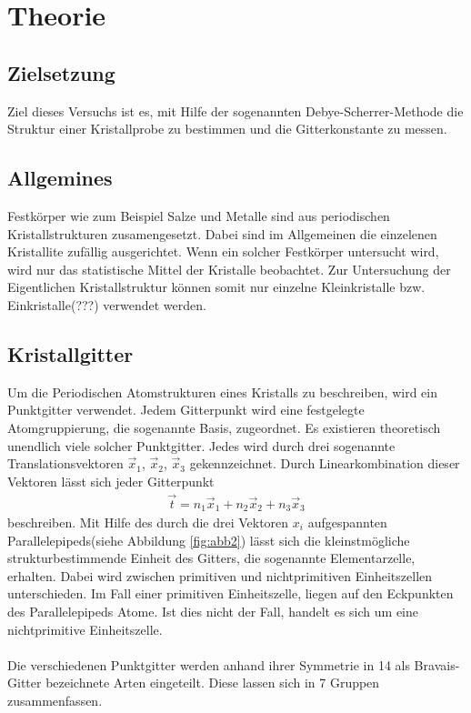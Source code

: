 \section{Theorie}
\label{sec:Theorie}

\subsection{Zielsetzung}
\label{subsec:Zielsetzung}
Ziel dieses Versuchs ist es, mit Hilfe der sogenannten
Debye-Scherrer-Methode die Struktur einer Kristallprobe
zu bestimmen und die Gitterkonstante zu messen.

\subsection{Allgemines}
\label{subsec:allgemein}

Festkörper wie zum Beispiel Salze und Metalle
sind aus periodischen
Kristallstrukturen zusamengesetzt. Dabei sind im
Allgemeinen die einzelenen Kristallite zufällig
ausgerichtet. Wenn ein solcher Festkörper untersucht wird,
wird nur das statistische Mittel der Kristalle beobachtet.
Zur Untersuchung der Eigentlichen Kristallstruktur
können somit nur einzelne Kleinkristalle bzw.
Einkristalle(???) verwendet werden.


\subsection{Kristallgitter}
\label{subsec:kristallstrukturen}
Um die Periodischen Atomstrukturen eines Kristalls
zu beschreiben, wird ein Punktgitter verwendet.
Jedem Gitterpunkt wird eine festgelegte Atomgruppierung,
die sogenannte Basis, zugeordnet.
Es existieren theoretisch unendlich viele solcher Punktgitter.
Jedes wird durch drei sogenannte Translationsvektoren
$\vec{x}_{1}$, $\vec{x}_{2}$, $\vec{x}_{3}$ gekennzeichnet.
Durch Linearkombination dieser Vektoren lässt sich
jeder Gitterpunkt
\begin{align}
  \label{eqn:1}
  \vec{t} = n_{1} \vec{x}_{1} + n_{2} \vec{x}_{2} + n_{3} \vec{x}_{3}
\end{align}
beschreiben.
Mit Hilfe des durch die drei Vektoren $x_{i}$ aufgespannten
Parallelepipeds(siehe Abbildung \ref{fig:abb2}) lässt sich die
kleinstmögliche strukturbestimmende Einheit des Gitters,
die sogenannte Elementarzelle, erhalten.
Dabei wird zwischen primitiven und nichtprimitiven Einheitszellen
unterschieden. Im Fall einer primitiven Einheitszelle,
liegen auf den Eckpunkten des Parallelepipeds Atome.
Ist dies nicht der Fall, handelt es sich um eine
nichtprimitive Einheitszelle.\\ \\
Die verschiedenen Punktgitter werden anhand ihrer Symmetrie
in 14 als Bravais-Gitter bezeichnete Arten eingeteilt.
Diese lassen sich in 7 Gruppen zusammenfassen.\\ \\
